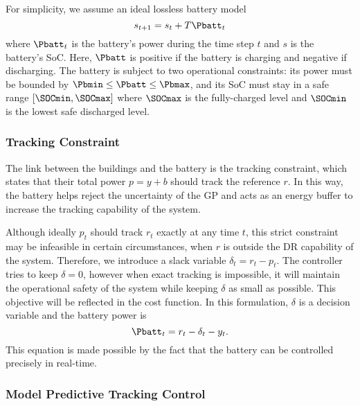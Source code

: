 For simplicity, we assume an ideal lossless battery model
\begin{equation}
\label{eq:battery-model}
  s_{t+1} = s_t + T \Pbatt_t
\end{equation}
where \(\Pbatt_t\) is the battery's power during the time step \(t\) and \(s\) is the battery's SoC.
Here, \(\Pbatt\) is positive if the battery is charging and negative if discharging.
The battery is subject to two operational constraints:
its power must be bounded by \(\Pbmin \leq \Pbatt \leq \Pbmax\), 
and its SoC must stay in a safe range \([\SOCmin, \SOCmax]\) where \(\SOCmax\) is the fully-charged level and \(\SOCmin\) is the lowest safe discharged level.


\subsubsection{Tracking Constraint}

The link between the buildings and the battery is the tracking constraint, which states that their total power \(p = y + b\) should track the reference \(r\).
In this way, the battery helps reject the uncertainty of the GP and acts as an energy buffer to increase the tracking capability of the system.


Although ideally \(p_t\) should track \(r_t\) exactly at any time \(t\), this strict constraint may be infeasible in certain circumstances, \eg when \(r\) is outside the DR capability of the system.
Therefore, we introduce a slack variable \(\delta_t = r_t - p_t\).
The controller tries to keep \(\delta = 0\), however when exact tracking is impossible, it will maintain the operational safety of the system while keeping \(\delta\)  as small as possible.
This objective will be reflected in the cost function. 
In this formulation, \(\delta\) is a decision variable  and the battery power is
\begin{equation}
\label{eq:battery-power}
\Pbatt_t = r_t - \delta_t - y_t \text.
\end{equation}
This equation is made possible by the fact that the battery can be controlled precisely in real-time.


\subsubsection{Model Predictive Tracking Control}

